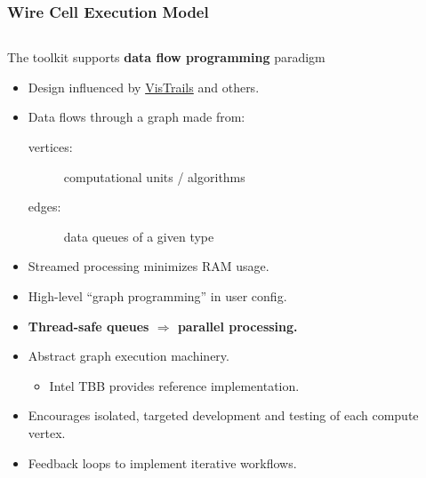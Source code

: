 \begin{frame}[fragile]
  \frametitle{Wire Cell Execution Model}

  \begin{columns}
    \begin{column}{0.7\textwidth}
      \footnotesize 
      The toolkit supports \textbf{data flow programming} paradigm
      \begin{itemize}
        \item Design influenced by
          \href{http://www0.bnl.gov/events/details.php?q=8932}{VisTrails} and others.
        \item Data flows through a graph made from:
          \begin{description}
          \item[vertices:] computational units / algorithms
          \item[edges:] data queues of a given type
          \end{description}
        \item Streamed processing minimizes RAM usage.
        \item High-level ``graph programming'' in user config.
        \item \textbf{Thread-safe queues $\Rightarrow$ parallel processing.}
        \item Abstract graph execution machinery.
          \begin{itemize}\scriptsize
          \item Intel TBB provides reference implementation.
          \end{itemize}
        \item Encourages isolated, targeted development and testing of each
          compute vertex.
        \item Feedback loops to implement iterative workflows.
        \end{itemize}
      \end{column}
      \begin{column}{0.3\textwidth}

        \vspace{-10mm}


\end{column}
\end{columns}
\end{frame}

